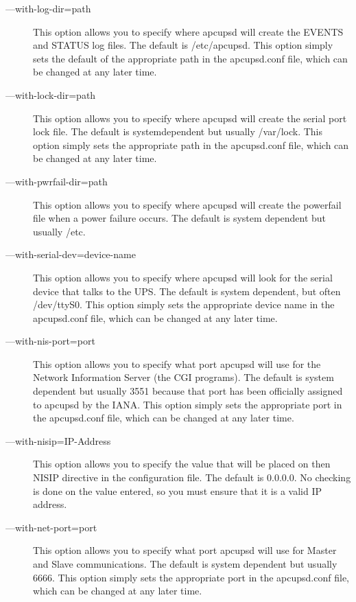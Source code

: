 \begin{description}
\item [{---}with-log-dir=\lt{}path\gt{}]
   This option allows you to specify where apcupsd will create the EVENTS and
STATUS log files. The default is /etc/apcupsd. This option simply sets the
default of the appropriate path in the apcupsd.conf file, which can be changed
at any later time.  

\item [{---}with-lock-dir=\lt{}path\gt{}]
   This option allows you to specify where apcupsd will create the serial port
lock file. The default is systemdependent but usually /var/lock. This option
simply sets the appropriate path in the apcupsd.conf file, which can be
changed at any later time.  

\item [{---}with-pwrfail-dir=\lt{}path\gt{}]
   This option allows you to specify where apcupsd will create the powerfail file
when a power failure occurs. The default is system dependent but usually /etc.
 

\item [{---}with-serial-dev=\lt{}device-name\gt{}]
   This option allows you to specify where apcupsd will look for the serial
device that talks to the UPS. The default is system dependent, but often
/dev/ttyS0. This option simply sets the appropriate device name in the
apcupsd.conf file, which can be changed at any later time.  

\item [{---}with-nis-port=\lt{}port\gt{}]
   This option allows you to specify what port apcupsd will use for the Network
Information Server (the CGI programs). The default is system dependent but
usually 3551 because that port has been officially assigned to apcupsd by the
IANA. This option simply sets the appropriate port in the apcupsd.conf file,
which can be changed at any later time.  

\item [{---}with-nisip=\lt{}IP-Address\gt{}]
   This option allows you to specify the value that will be placed on then NISIP
directive in the configuration file. The default is 0.0.0.0. No checking is
done on the value entered, so you must ensure that it is a valid IP address.  

\item [{---}with-net-port=\lt{}port\gt{}]
   This option allows you to specify what port apcupsd will use for Master and
Slave communications. The default is system dependent but usually 6666. This
option simply sets the appropriate port in the apcupsd.conf file, which can be
changed at any later time.  


\end{description}
